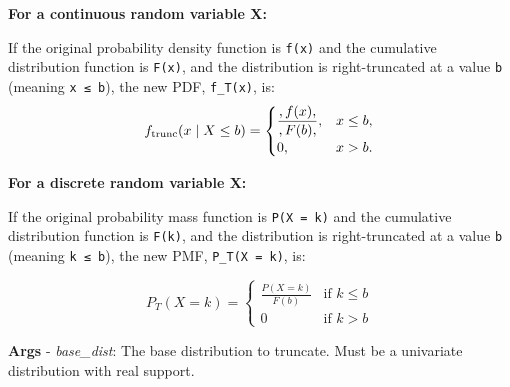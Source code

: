 \documentclass[
  letterpaper,
  DIV=11,
  numbers=noendperiod]{scrartcl}
\begin{document}
\textbf{For a continuous random variable X:}

If the original probability density function is \texttt{f(x)} and the
cumulative distribution function is \texttt{F(x)}, and the distribution
is right-truncated at a value \texttt{b} (meaning \texttt{x\ ≤\ b}), the
new PDF, \texttt{f\_T(x)}, is: \[
  f_{\rm trunc}(x \mid X \le b) =
  \begin{cases}
  \displaystyle \frac{,f(x),}{,F(b),}, & x \le b, \\
  0, & x > b.
  \end{cases}
  \]

\textbf{For a discrete random variable X:}

If the original probability mass function is \texttt{P(X\ =\ k)} and the
cumulative distribution function is \texttt{F(k)}, and the distribution
is right-truncated at a value \texttt{b} (meaning \texttt{k\ ≤\ b}), the
new PMF, \texttt{P\_T(X\ =\ k)}, is:

\[P_T(X=k) = \begin{cases} \frac{P(X=k)}{F(b)} & \text{if } k \le b \\ 0 & \text{if } k > b \end{cases}\]

\textbf{Args} - \emph{base\_dist}: The base distribution to truncate.
Must be a univariate distribution with real support.
\end{document}
